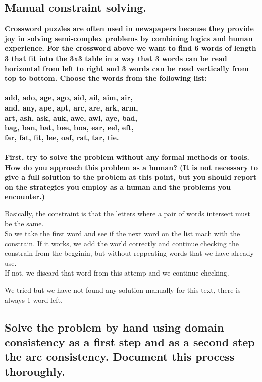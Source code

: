 \documentclass[paper=a4, fontsize=11pt]{scrartcl} %
\numberwithin{equation}{section} %
\numberwithin{figure}{section} %
\numberwithin{table}{section} %
\begin{document}
\subsection*{Manual constraint solving.}

\textbf{
Crossword puzzles are often used in newspapers because they provide joy in solving semi-complex problems by combining logics and human experience. For the crossword above we want to find 6 words of length 3 that fit into the 3x3 table in a way that 3 words can be read horizontal from left to right and 3 words can be read vertically from top to bottom. Choose the words from the following list:\\
\\
add, ado, age, ago, aid, ail, aim, air,\\
and, any, ape, apt, arc, are, ark, arm,\\
art, ash, ask, auk, awe, awl, aye, bad,\\
bag, ban, bat, bee, boa, ear, eel, eft,\\
far, fat, fit, lee, oaf, rat, tar, tie.\\
\\
First, try to solve the problem without any formal methods or tools. How do you approach this problem as a human? (It is not necessary to give a full solution to the problem at this point, but you should report on the strategies you employ as a human and the problems you encounter.)
}
\newline
 
Basically, the constraint is that the letters where a pair of words intersect must be the same.\\
So we take the first word and see if the next word on the list mach with the constrain. If it works, we add the world correctly and continue checking the constrain from the begginin, but without reppeating words that we have already use.\\ If not, we discard that word from this attemp and we continue checking.

We tried but we have not found any solution manually for this text, there is always 1 word left.

\newpage
\subsection*{Solve the problem by hand using domain consistency as a first step and as a second step the arc consistency. Document this process thoroughly.}
\end{document}
